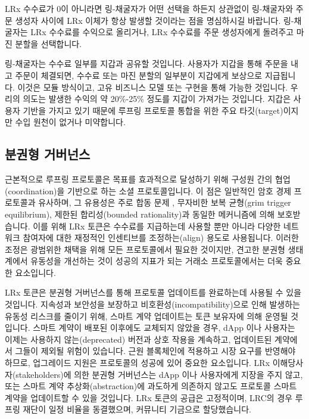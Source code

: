 \documentclass[UTF8,nofonts]{article}
\begin{document}
\begin{multicols}{2}
LRx 수수료가 0이 아니라면 링-채굴자가 어떤 선택을 하든지 상관없이 링-채굴자와 주문 생성자 사이에 LRx 이체가 항상 발생할 것이라는 점을 명심하시길 바랍니다. 링-채굴자는 LRx 수수료를 수익으로 올리거나, LRx 수수료를 주문 생성자에게 돌려주고 마진 분할을 선택합니다. 

링-채굴자는 수수료 일부를 지갑과 공유할 것입니다. 사용자가 지갑을 통해 주문을 내고 주문이 체결되면, 수수료 또는 마진 분할의 일부분이 지갑에게 보상으로 지급됩니다. 이것은 모듈 방식이고, 고유 비즈니스 모델 또는 구현을 통해 가능한 것입니다. 우리의 의도는 발생한 수익의 약 20\%-25\% 정도를 지갑이 가져가는 것입니다. 지갑은 사용자 기반을 가지고 있기 때문에 루프링 프로토콜 통합을 위한 주요 타깃(target)이지만 수입 원천이 없거나 미약합니다.   


\subsection{분권형 거버넌스}
근본적으로 루프링 프로토콜은 목표를 효과적으로 달성하기 위해 구성원 간의 협업(coordination)을 기반으로 하는 소셜 프로토콜입니다. 이 점은 일반적인 암호 경제 프로토콜과 유사하며, 그 유용성은 주로 합동 문제 \cite{vitalikgovernance}, 무자비한 보복 균형(grim trigger equilibrium), 제한된 합리성(bounded rationality)과 동일한 메커니즘에 의해 보호받습니다. 이를 위해 LRx 토큰은 수수료를 지급하는데 사용할 뿐만 아니라 다양한 네트워크 참여자에 대한 재정적인 인센티브를 조정하는(align) 용도로 사용됩니다. 이러한 조정은 광범위한 채택을 위해 모든 프로토콜에서 필요한 것이지만, 견고한 분권형 생태계에서 유동성을 개선하는 것이 성공의 지표가 되는 거래소 프로토콜에서는 더욱 중요한 요소입니다.  

LRx 토큰은 분권형 거버넌스를 통해 프로토콜 업데이트를 완료하는데 사용될 수 있을 것입니다. 지속성과 보안성을 보장하고 비호환성(incompatibility)으로 인해 발생하는 유동성 리스크를 줄이기 위해, 스마트 계약 업데이트는 토큰 보유자에 의해 운영될 것입니다. 스마트 계약이 배포된 이후에도 교체되지 않았을 경우, dApp 이나 사용자는 이제는 사용하지 않는(deprecated) 버전과 상호 작용을 계속하고, 업데이트된 계약에서 그들이 제외될 위험이 있습니다. 근원 블록체인에 적용하고 시장 요구를 반영해야 하므로, 업그레이드 지원은 프로토콜의 성공에 있어 중요한 요소입니다. LRx 이해당사자(stakeholders)에 의한 분권형 거버넌스는 dApp 이나 사용자에게 지장을 주지 않고, 또는 스마트 계약 추상화(abstraction)에 과도하게 의존하지 않고도 프로토콜 스마트 계약을 업데이트할 수 있을 것입니다. LRx 토큰의 공급은 고정적이며, LRC의 경우 루프링 재단이 일정 비율을 동결했으며, 커뮤니티 기금\cite{LRCtokendoc}으로 할당했습니다. 


\end{multicols}
\end{document}
